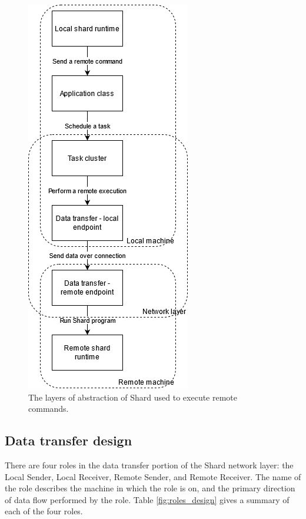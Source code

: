 \documentclass[twoside]{report}
\begin{document}
\begin{figure}[h]
  \begin{center}
    \includegraphics[scale=0.5]{img/shard_network_design.png}
    \caption{The layers of abstraction of Shard used to execute remote commands.}
    \label{fig:network_layer_design}
  \end{center}
\end{figure}

\subsection{Data transfer design}
There are four roles in the data transfer portion of the Shard network layer: the Local Sender, Local Receiver, Remote Sender, and Remote Receiver.
The name of the role describes the machine in which the role is on, and the primary direction of data flow performed by the role.
Table \ref{fig:roles_design} gives a summary of each of the four roles.
\end{document}
